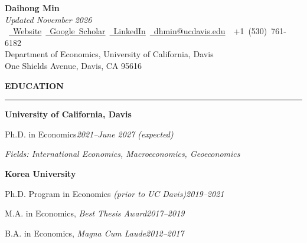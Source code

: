 \documentclass[11pt]{article}
\newcommand{\sechead}[1]{%
  \vspace{4pt}%
  {\normalsize\bfseries\uppercase{#1}}\\[-8pt]%
  \noindent\rule{\textwidth}{0.4pt}%
  \vspace{0.5pt}%
}
\begin{document}
\begin{center}
    {\LARGE \textbf{Daihong Min} \\
    \vspace{0.1em}
    \small\noindent \textit{Updated November 2026}}\\[5pt]
    \mbox{\small
    \href{https://www.daihongmin.com/}{\faGlobe\ Website} \quad
    \href{https://scholar.google.com/citations?user=9xPqwXAAAAAJ&hl=en}{\faGoogle\ Google Scholar} \quad
    \href{https://www.linkedin.com/in/daihongmin/}{\faLinkedin\ LinkedIn} \quad
    \href{mailto:dhmin@ucdavis.edu}{\faEnvelope\ dhmin@ucdavis.edu} \quad
    \faPhone\ +1 (530) 761-6182}\\[5pt]
    Department of Economics, University of California, Davis\\
    One Shields Avenue, Davis, CA 95616
\end{center}

\sechead{{\large E}DUCATION}
\begingroup
\setlength{\parskip}{0pt}
\textbf{University of California, Davis}\par\nobreak
{\small Ph.D. in Economics\hfill\textit{2021--June 2027 (expected)}\par}
{\small\textit{Fields: International Economics, Macroeconomics, Geoeconomics}\par}
\vspace{4pt}
\textbf{Korea University}\par\nobreak
{\small Ph.D. Program in Economics \textit{(prior to UC Davis)}\hfill\textit{2019--2021}\par}
{\small M.A. in Economics, \textit{Best Thesis Award}\hfill\textit{2017--2019}\par}
{\small B.A. in Economics, \textit{Magna Cum Laude}\hfill\textit{2012--2017}\par}
\endgroup
\end{document}
